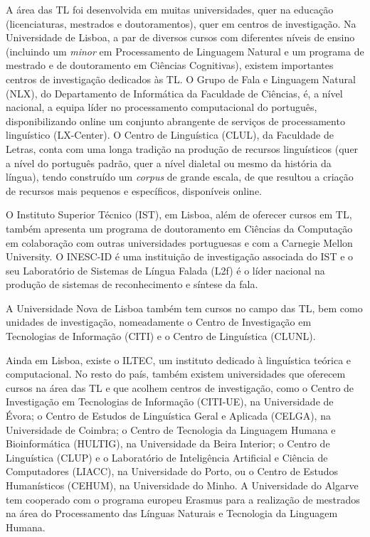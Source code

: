 \documentclass[]{../metanetpaper}
\begin{document}
\begin{multicols}{2}
A área das TL foi desenvolvida em muitas universidades, quer na educação (licenciaturas, mestrados e doutoramentos), quer em centros de investigação. Na Universidade de Lisboa, a par de diversos cursos com diferentes níveis de ensino (incluindo um \textit{minor} em Processamento de Linguagem Natural e um programa de mestrado e de doutoramento em Ciências Cognitivas), existem importantes centros de investigação dedicados às TL. O Grupo de Fala e Linguagem Natural (NLX), do Departamento de Informática da Faculdade de Ciências, é, a nível nacional, a equipa líder no processamento computacional do português, disponibilizando online um conjunto abrangente de serviços de processamento linguístico (LX-Center). O Centro de Linguística (CLUL), da Faculdade de Letras, conta com uma longa tradição na produção de recursos linguísticos (quer a nível do português padrão, quer a nível dialetal ou mesmo da história da língua), tendo construído um \textit{corpus} de grande escala, de que resultou a criação de recursos mais pequenos e específicos, disponíveis online.

O Instituto Superior Técnico (IST), em Lisboa, além de oferecer cursos em TL, também apresenta um programa de doutoramento em Ciências da Computação em colaboração com outras universidades portuguesas e com a Carnegie Mellon University. O INESC-ID é uma instituição de investigação associada do IST e o seu Laboratório de Sistemas de Língua Falada (L2f) é o líder nacional na produção de sistemas de reconhecimento e síntese da fala.

A Universidade Nova de Lisboa também tem cursos no campo das TL, bem como unidades de investigação, nomeadamente o Centro de Investigação em Tecnologias de Informação (CITI) e o Centro de Linguística (CLUNL). 

Ainda em Lisboa, existe o ILTEC, um instituto dedicado à linguística teórica e computacional. No resto do país, também existem universidades que oferecem cursos na área das TL e que acolhem centros de investigação, como o Centro de Investigação em Tecnologias de Informação (CITI-UE), na Universidade de Évora; o Centro de Estudos de Linguística Geral e Aplicada (CELGA), na Universidade de Coimbra; o Centro de Tecnologia da Linguagem Humana e Bioinformática (HULTIG), na Universidade da Beira Interior; o Centro de Linguística (CLUP) e o Laboratório de Inteligência Artificial e Ciência de Computadores (LIACC), na Universidade do Porto, ou o Centro de Estudos Humanísticos (CEHUM), na Universidade do Minho. A Universidade do Algarve tem cooperado com o programa europeu Erasmus para a realização de mestrados na área do Processamento das Línguas Naturais e Tecnologia da Linguagem Humana.


\end{multicols}
\end{document}
